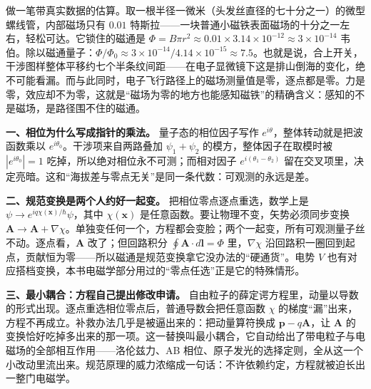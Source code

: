 \begin{mainline}
做一笔带真实数据的估算。取一根半径一微米（头发丝直径的七十分之一）的微型螺线管，内部磁场只有 \(0.01\) 特斯拉——一块普通小磁铁表面磁场的十分之一左右，轻松可达。它锁住的磁通是 \(\Phi=B\pi r^{2}\approx0.01\times3.14\times10^{-12}\approx3\times10^{-14}\) 韦伯。除以磁通量子：\(\Phi/\Phi_0\approx3\times10^{-14}/4.14\times10^{-15}\approx7.5\)。也就是说，合上开关，干涉图样整体平移约七个半条纹间距——在电子显微镜下这是排山倒海的变化，绝不可能看漏。而与此同时，电子飞行路径上的磁场测量值是零，逐点都是零。力是零，效应却不为零，这就是“磁场为零的地方也能感知磁铁”的精确含义：感知的不是磁场，是路径围不住的磁通。
\end{mainline}

\begin{mathbridge}
\textbf{一、相位为什么写成指针的乘法。} 量子态的相位因子写作 \(e^{i\theta}\)，整体转动就是把波函数乘以 \(e^{i\theta_0}\)。干涉项来自两路叠加 \(\psi_1+\psi_2\) 的模方，整体因子在取模时被 \(|e^{i\theta_0}|=1\) 吃掉，所以绝对相位永不可测；而相对因子 \(e^{i(\theta_1-\theta_2)}\) 留在交叉项里，决定亮暗。这和“海拔差与零点无关”是同一条代数：可观测的永远是差。

\textbf{二、规范变换是两个人约好一起变。} 把相位零点逐点重选，数学上是 \(\psi\to e^{iq\chi(\mathbf x)/\hbar}\psi\)，其中 \(\chi(\mathbf x)\) 是任意函数。要让物理不变，矢势必须同步变换 \(\mathbf A\to\mathbf A+\nabla\chi\)。单独变任何一个，方程都会变脸；两个一起变，所有可观测量子丝不动。逐点看，\(\mathbf A\) 改了；但回路积分 \(\oint\mathbf A\cdot d\mathbf l=\Phi\) 里，\(\nabla\chi\) 沿回路积一圈回到起点，贡献恒为零——所以磁通是规范变换拿它没办法的“硬通货”。电势 \(V\) 也有对应搭档变换，本书电磁学部分用过的“零点任选”正是它的特殊情形。

\textbf{三、最小耦合：方程自己提出修改申请。} 自由粒子的薛定谔方程里，动量以导数的形式出现。逐点重选相位零点后，普通导数会把任意函数 \(\chi\) 的梯度“漏”出来，方程不再成立。补救办法几乎是被逼出来的：把动量算符换成 \(\mathbf p-q\mathbf A\)，让 \(\mathbf A\) 的变换恰好吃掉多出来的那一项。这一替换叫最小耦合，它自动给出了带电粒子与电磁场的全部相互作用——洛伦兹力、AB 相位、原子发光的选择定则，全从这一个小改动里流出来。规范原理的威力浓缩成一句话：不许依赖约定，方程就被迫长出一整门电磁学。
\end{mathbridge}

